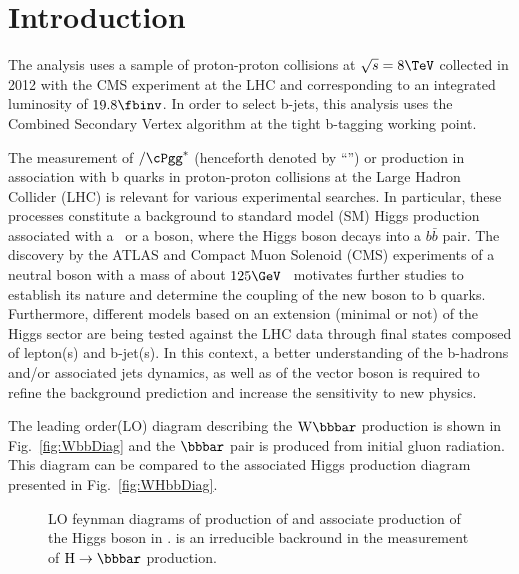 \section{Introduction}\label{Intro}
The analysis uses a sample of proton-proton collisions 
at $\sqrt{s}=8\TeV$ collected in 2012 with the CMS experiment at the LHC 
and  corresponding to an 
integrated luminosity of $19.8\fbinv$. In order to select b-jets, this analysis uses
the Combined Secondary Vertex algorithm at the tight b-tagging working point. 



The measurement of \cPZ$/\cPgg^*$ (henceforth denoted by ``\cPZ'') or
\Wpm production in association with b quarks in proton-proton
collisions at the Large Hadron Collider (LHC) is relevant for various
experimental searches. In particular, these processes constitute a
background to standard model (SM) Higgs production associated with a
\cPZ~or a \Wpm boson, where the Higgs boson decays into a $b\bar{b}$
pair. The discovery by the ATLAS and Compact Muon Solenoid (CMS)
experiments of a neutral boson with a mass of about
$125\GeV$~\cite{Aad:2012tfa,Chatrchyan:2012ufa} motivates further studies to
establish its nature and determine the coupling of the new boson to b
quarks. Furthermore, different models based on an extension (minimal
or not) of the Higgs sector are being tested against the LHC data
through final states composed of lepton(s) and b-jet(s).  In this
context, a better understanding of the b-hadrons and/or associated
jets dynamics, as well as of the vector boson is required to refine
the background prediction and increase the sensitivity to new physics.

The leading order(LO) diagram describing the $\Wbb$ production is  
shown in Fig.~\ref{fig:WbbDiag} and the $\bbbar$ pair is produced from initial gluon radiation.
This diagram can be compared  
to the associated Higgs
production diagram presented in Fig.~\ref{fig:WHbbDiag}. 

\begin{figure}[!hbtp]
    \center
    \caption{LO feynman diagrams of production of \Wmnbb and associate production of the Higgs boson in \WmnH. 
\Wmnbb is an irreducible backround in the measurement of $\HBB$ production.}
    \label{fig:diagrams}
\end{figure}

